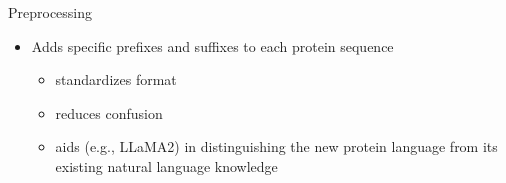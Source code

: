 \documentclass[dvipsnames,
hyperref={
	citecolor=blue,
	colorlinks=true,
	urlcolor=blue,
	linkcolor=,
}
]{beamer}
\begin{document}






\begin{frame}{Preprocessing}
	\begin{itemize}
		\item Adds specific prefixes and suffixes to each protein sequence
		\begin{itemize}\setlength\itemsep{1em}
			\item standardizes format
			\item reduces confusion
			\item aids (e.g., LLaMA2) in distinguishing the new protein language from its existing natural language knowledge
		\end{itemize}
	\end{itemize}
\end{frame}
\end{document}
